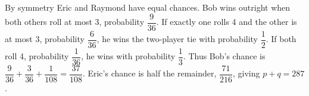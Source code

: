 By symmetry Eric and Raymond have equal chances. Bob wins outright when both others roll at most 3, probability $\dfrac{9}{36}$. If exactly one rolls 4 and the other is at most 3, probability $\dfrac{6}{36}$, he wins the two-player tie with probability $\dfrac{1}{2}$. If both roll 4, probability $\dfrac{1}{36}$, he wins with probability $\dfrac{1}{3}$. Thus Bob's chance is $\dfrac{9}{36}+\dfrac{3}{36}+\dfrac{1}{108}=\dfrac{37}{108}$. Eric's chance is half the remainder, $\dfrac{71}{216}$, giving $\boxed{p+q=287}$.
